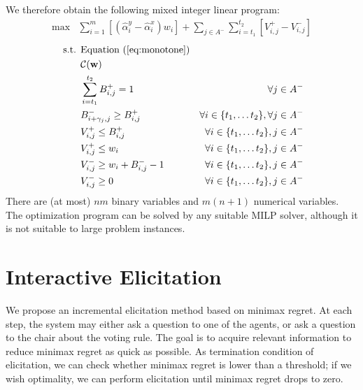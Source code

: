 \documentclass[12pt]{article}
\newcommand{\w}{\textbf{w}}%
\newcommand{\C}{\mathcal{C}}%
\DeclareMathOperator{\PMR}{PMR}
\newtheorem{claim}{Claim}
\begin{document}
We therefore obtain the following mixed integer linear program:
\begin{align}
\max & \sum_{i=1}^m  [(\hat{\alpha}_{i}^{y} - \hat{\alpha}_{i}^{x}) w_{i}] +
  \sum_{j \in A^{-}} \sum_{i=t_{1}}^{t_{2}}  [V_{i,j}^{+} - V_{i,j}^{-}]
\end{align}
\begin{align}
\text{ s.t. } &  \text{Equation } (\ref{eq:monotone}) & \\
&  \C(\w) &  \\
& \sum_{i=t_{1}}^{t_{2}} B_{i,j}^{+} = 1 & \forall j \in A^{-} \\
& B_{i+\gamma_{j},j}^{-} \geq B_{i,j}^{+} & \forall i \in \{ t_{1}, \ldots t_{2}\}, \forall j \in A^{-} \\
& V_{i,j}^{+} \leq B_{i,j}^{+}  & \forall i \in \{ t_{1}, \ldots t_{2}\}, j \in A^{-} \\
& V_{i,j}^{+} \leq w_i & \forall i \in \{ t_{1}, \ldots t_{2}\}, j \in A^{-} \\
& V_{i,j}^{-} \geq w_{i} + B_{i,j}^{-} - 1 & \forall i \in \{ t_{1}, \ldots t_{2}\}, j \in A^{-}\\
& V_{i,j}^{-} \geq 0 & \forall i \in \{ t_{1}, \ldots t_{2}\}, j \in A^{-}
\end{align} 
There are (at most) $nm$ binary variables and $m(n+1)$ numerical variables.
The optimization program can be solved by any suitable MILP solver, although it is not suitable to large problem instances.


\section{Interactive Elicitation} \label{sec:elicit}

We propose an incremental elicitation method based on minimax regret.
At each step, the system may either ask a question to one of the agents, or ask a question to the chair about the voting rule. 
The goal is to acquire relevant information to reduce minimax regret as quick as possible.
As termination condition of elicitation, we can check whether minimax regret is lower than a threshold; if we wish optimality, we can perform elicitation until minimax regret drops to zero.
\end{document}
